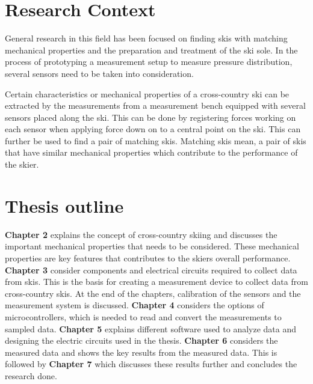 \section{Research Context}
\label{sec:reasearchcontext}
General research in this field has been focused on finding skis with matching mechanical properties and the preparation and treatment of the ski sole.
In the process of prototyping a measurement setup to measure pressure distribution, several sensors need to be taken into consideration. 

Certain characteristics or mechanical properties of a cross-country ski can be extracted by the measurements from a measurement bench equipped with several sensors placed along the ski. This can be done by registering forces working on each sensor when applying force down on to a central point on the ski. This can further be used to find a pair of matching skis. Matching skis mean, a pair of skis that have similar mechanical properties which contribute to the performance of the skier.

\section{Thesis outline}
\textbf{Chapter 2} explains the concept of cross-country skiing and discusses the important mechanical properties that needs to be considered. These mechanical properties are key features that contributes to the skiers overall performance. \newline
\textbf{Chapter 3} consider components and electrical circuits required to collect data from skis. This is the basis for creating a measurement device to collect data from cross-country skis. At the end of the chapters, calibration of the sensors and the measurement system is discussed. \newline
\textbf{Chapter 4} considers the options of microcontrollers, which is needed to read and convert the measurements to sampled data. \newline
\textbf{Chapter 5} explains different software used to analyze data and designing the electric circuits used in the thesis. \newline
\textbf{Chapter 6} considers the measured data and shows the key results from the measured data. This is followed by \textbf{Chapter 7} which discusses these results further and concludes the research done.
